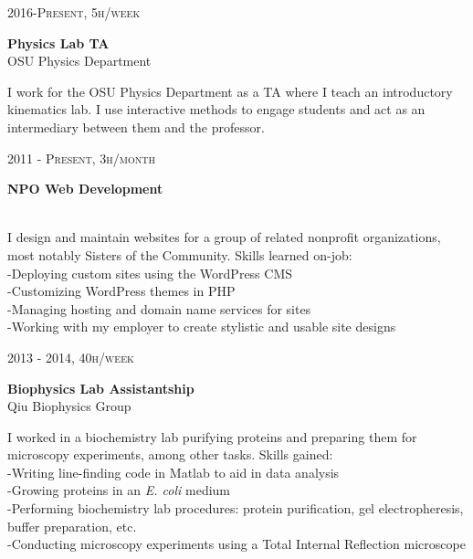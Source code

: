 \documentclass[10pt]{article} %
\begin{document}
{\begin{minipage}[t]{0.5\textwidth}

{\raggedleft\textsc{2016-Present, 5h/week}\par}
{\raggedright\large \textbf{Physics Lab TA}\\
{OSU Physics Department}\\[5pt]}
\normalsize{I work for the OSU Physics Department as a TA where I teach an introductory
  kinematics lab. I use interactive methods to engage students and act as an intermediary
between them and the professor.}\\


{\raggedleft\textsc{2011 - Present, 3h/month}\par}

{\raggedright\large \textbf{NPO Web Development}}\\
\normalsize{I design and maintain websites for a group of related nonprofit organizations, most notably Sisters of the Community. Skills learned on-job:}\\
\hspace*{0.2in}-Deploying custom sites using the WordPress CMS \\
\hspace*{0.2in}-Customizing WordPress themes in PHP \\
\hspace*{0.2in}-Managing hosting and domain name services for sites \\
\hspace*{0.2in}-Working with my employer to create stylistic and usable site designs \\


{\raggedleft\textsc{2013 - 2014, 40h/week}\par}

{\raggedright\large \textbf{Biophysics Lab Assistantship}\\
{Qiu Biophysics Group}\\[5pt]}
\normalsize{I worked in a biochemistry lab purifying proteins and preparing them for microscopy experiments, among other tasks. Skills gained:}\\
\hspace*{0.2in}-Writing line-finding code in Matlab to aid in data analysis\\
\hspace*{0.2in}-Growing proteins in an \textit{E. coli} medium\\
\hspace*{0.2in}-Performing biochemistry lab procedures: protein purification, gel electropheresis, buffer preparation, etc.\\
\hspace*{0.2in}-Conducting microscopy experiments using a Total Internal Reflection microscope


\end{minipage}}
\end{document}
